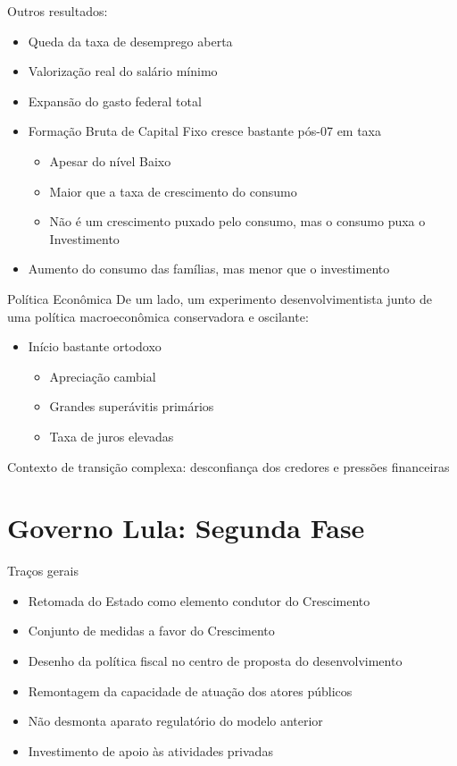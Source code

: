 \documentclass[presentation]{beamer}
\begin{document}
\begin{frame}[label={sec:org07d9303}]{Outros resultados:}
\begin{itemize}
\item Queda da taxa de desemprego aberta
\item Valorização real do salário mínimo
\item Expansão do gasto federal total
\item Formação Bruta de Capital Fixo cresce bastante pós-07 em taxa
\begin{itemize}
\item Apesar do nível Baixo
\item Maior que a taxa de crescimento do consumo
\item Não é um crescimento puxado pelo consumo, mas o consumo puxa o Investimento
\end{itemize}
\item Aumento do consumo das famílias, mas menor que o investimento
\end{itemize}
\end{frame}


\begin{frame}[label={sec:orgce951aa}]{Política Econômica}
De um lado, um experimento desenvolvimentista junto de uma política macroeconômica conservadora e oscilante:
\begin{itemize}
\item Início bastante ortodoxo
\begin{itemize}
\item Apreciação cambial
\item Grandes superávitis primários
\item Taxa de juros elevadas
\end{itemize}
\end{itemize}

\alert{Contexto de transição complexa:} desconfiança dos credores e pressões financeiras
\end{frame}

\section{Governo Lula: Segunda Fase}
\label{sec:orgf9e2a08}

\begin{frame}[label={sec:orgee045da}]{Traços gerais}
\begin{itemize}
\item Retomada do Estado como elemento condutor do Crescimento
\item Conjunto de medidas a favor do Crescimento
\item Desenho da política fiscal no centro de proposta do desenvolvimento
\item Remontagem da capacidade de atuação dos atores públicos
\item Não desmonta aparato regulatório do modelo anterior
\item Investimento de apoio às atividades privadas
\end{itemize}
\end{frame}
\end{document}
